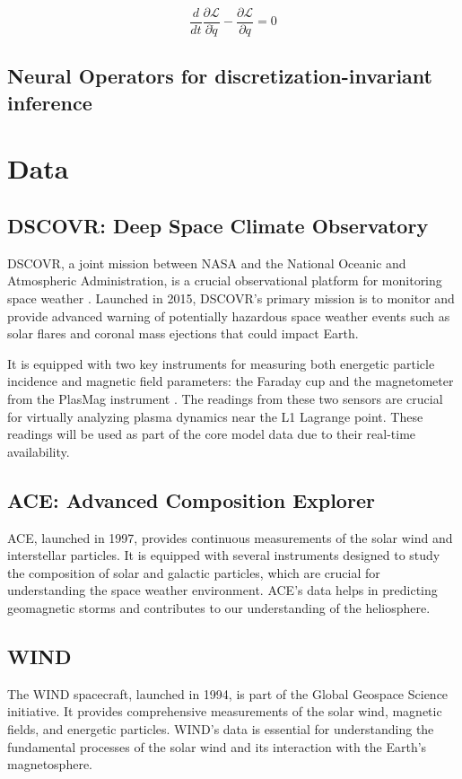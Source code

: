\documentclass[12pt]{article}
\begin{document}
\begin{equation}
    \frac{d}{dt} \frac{\partial \mathcal{L}}{\partial \dot q} - \frac{\partial \mathcal{L}}{\partial q} = 0
\end{equation}

\subsection{Neural Operators for discretization-invariant inference}


\section{Data}

\subsection{DSCOVR: Deep Space Climate Observatory}
DSCOVR, a joint mission between NASA and the National Oceanic and Atmospheric Administration, is a crucial observational platform for monitoring space weather \cite{nasa_dscovr}. Launched in 2015, DSCOVR's primary mission is to monitor and provide advanced warning of potentially hazardous space weather events such as solar flares and coronal mass ejections that could impact Earth.

It is equipped with two key instruments for measuring both energetic particle incidence and magnetic field parameters: the Faraday cup and the magnetometer from the PlasMag instrument \cite{nasa_dscovr}. The readings from these two sensors are crucial for virtually analyzing plasma dynamics near the L1 Lagrange point. These readings will be used as part of the core model data due to their real-time availability.

\subsection{ACE: Advanced Composition Explorer}
ACE, launched in 1997, provides continuous measurements of the solar wind and interstellar particles. It is equipped with several instruments designed to study the composition of solar and galactic particles, which are crucial for understanding the space weather environment. ACE's data helps in predicting geomagnetic storms and contributes to our understanding of the heliosphere.

\subsection{WIND}
The WIND spacecraft, launched in 1994, is part of the Global Geospace Science initiative. It provides comprehensive measurements of the solar wind, magnetic fields, and energetic particles. WIND's data is essential for understanding the fundamental processes of the solar wind and its interaction with the Earth's magnetosphere.
\end{document}
